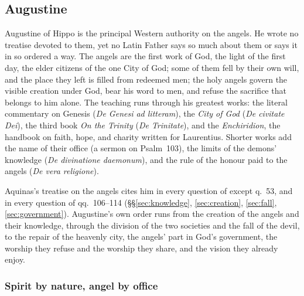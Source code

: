 \sectionguard\subsection{Augustine}\label{sec:fl-augustine}

Augustine of Hippo is the principal Western authority on the angels. He
wrote no treatise devoted to them, yet no Latin Father says so much about
them or says it in so ordered a way. The angels are the first work of God,
the light of the first day, the elder citizens of the one City of God;
some of them fell by their own will, and the place they left is filled
from redeemed men; the holy angels govern the visible creation under God,
bear his word to men, and refuse the sacrifice that belongs to him alone.
The teaching runs through his greatest works: the literal commentary on
Genesis (\emph{De Genesi ad litteram}), the \emph{City of God}
(\emph{De civitate Dei}), the third book \emph{On the Trinity}
(\emph{De Trinitate}), and the \emph{Enchiridion}, the handbook on faith,
hope, and charity written for Laurentius. Shorter works add the name of
their office (a sermon on Psalm~103), the limits of the demons' knowledge
(\emph{De divinatione daemonum}), and the rule of the honour paid to the
angels (\emph{De vera religione}).

Aquinas's treatise on the angels cites him in every question of  except q.~53, and in every question of qq.~106--114
(\S\S\ref{sec:knowledge}, \ref{sec:creation}, \ref{sec:fall},
\ref{sec:government}). Augustine's own order runs from the creation of the
angels and their knowledge, through the division of the two societies and
the fall of the devil, to the repair of the heavenly city, the angels' part
in God's government, the worship they refuse and the worship they share,
and the vision they already enjoy.

\subsubsection{Spirit by nature, angel by office}\label{sec:aug-name}

